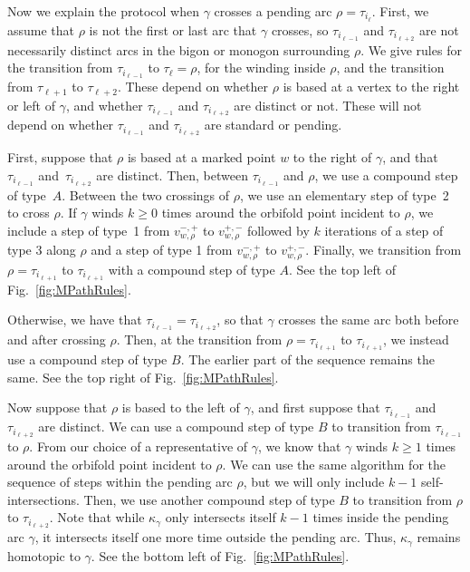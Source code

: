 Now we explain the protocol when $\gamma$ crosses a pending arc $\rho = \tau_{i_\ell}$. First, we assume that $\rho$ is not the first or last arc that $\gamma$ crosses, so $\tau_{i_{\ell-1}}$ and $\tau_{i_{\ell+2}}$ are not necessarily distinct arcs in the bigon or monogon surrounding $\rho$. We give rules for the transition from $\tau_{i_{\ell-1}}$ to $\tau_\ell = \rho$, for the winding inside $\rho$, and the transition from $\tau_{\ell+1}$ to $\tau_{\ell+2}$. These depend on whether $\rho$ is based at a vertex to the right or left of $\gamma$, and whether $\tau_{i_{\ell-1}}$ and $\tau_{i_{\ell+2}}$ are distinct or not. These will not depend on whether $\tau_{i_{\ell-1}}$ and $\tau_{i_{\ell+2}}$ are standard or pending.


First, suppose that $\rho$ is based at a marked point $w$ to the right of $\gamma$, and that~$\tau_{i_{\ell-1}}$ and~$\tau_{i_{\ell+2}}$ are distinct. Then, between $\tau_{i_{\ell-1}}$ and $\rho$, we use a compound step of type~$A$. Between the two crossings of $\rho$, we use an elementary step of type~2 to cross $\rho$. If $\gamma$ winds $k \geq 0$ times around the orbifold point incident to $\rho$, we include a step of type~1 from $v^{-,+}_{w,\rho}$ to $v^{+,-}_{w,\rho}$ followed by $k$ iterations of a step of type 3 along $\rho$ and a step of type 1 from $v^{-,+}_{w,\rho}$ to $v^{+,-}_{w,\rho}$. Finally, we transition from $\rho = \tau_{i_{\ell+1}}$ to $\tau_{i_{\ell+1}}$ with a compound step of type $A$. See the top left of Fig.~\ref{fig:MPathRules}.

Otherwise, we have that $\tau_{i_{\ell-1}} = \tau_{i_{\ell+2}}$, so that $\gamma$ crosses the same arc both before and after crossing $\rho$. Then, at the transition from $\rho = \tau_{i_{\ell+1}}$ to $\tau_{i_{\ell+1}}$, we instead use a compound step of type $B$. The earlier part of the sequence remains the same. See the top right of Fig.~\ref{fig:MPathRules}.

Now suppose that $\rho$ is based to the left of $\gamma$, and first suppose that $\tau_{i_{\ell-1}}$ and $\tau_{i_{\ell+2}}$ are distinct. We can use a compound step of type $B$ to transition from $\tau_{i_{\ell-1}}$ to $\rho$. From our choice of a representative of $\gamma$, we know that $\gamma$ winds $k \geq 1$ times around the orbifold point incident to $\rho$. We can use the same algorithm for the sequence of steps within the pending arc $\rho$, but we will only include $k-1$ self-intersections. Then, we use another compound step of type $B$ to transition from $\rho$ to $\tau_{i_{\ell+2}}$. Note that while $\kappa_\gamma$ only intersects itself $k-1$ times inside the pending arc $\gamma$, it intersects itself one more time outside the pending arc. Thus, $\kappa_\gamma$ remains homotopic to $\gamma$. See the bottom left of Fig.~\ref{fig:MPathRules}.

